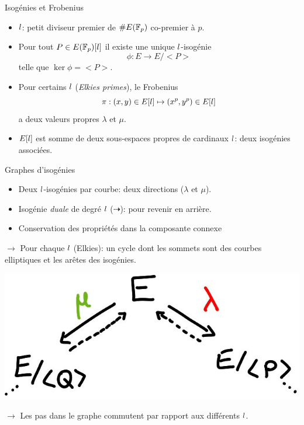 \documentclass{beamer}
\begin{document}
\begin{frame}{Isog\'enies et Frobenius}

	\begin{itemize}
		\item  $\mathnormal{l}$: petit diviseur premier de $\#E(\mathbb{F}_p)$ co-premier \`a $p$.
		\item Pour  tout $P\in E(\mathbb{F}_p)[\mathnormal{l}]$ il existe une unique $\mathnormal{\mathnormal{l}}$-isog\'enie
	\[
		\phi: E\rightarrow E/<P>
	\]
	telle que $\ker\phi = <P>$.
\item Pour certains $\mathnormal{\mathnormal{l}}$ (\textit{Elkies primes}), le Frobenius
		\[
			\pi: (x, y)\in E[\mathnormal{l}]\mapsto (x^p, y^p)\in E[\mathnormal{l}]
		\]
	a deux valeurs propres $\lambda$ et $\mu$.
\item $E[\mathnormal{l}]$ est somme de deux sous-espaces propres de cardinaux $\mathnormal{l}$: deux isog\'enies associ\'ees.
	\end{itemize}
\end{frame}

\begin{frame}{Graphes d'isog\'enies}
	\begin{itemize}
		\item Deux $\mathnormal{l}$-isog\'enies par courbe: deux directions ($\lambda$ et $\mu$).
		\item Isog\'enie \textit{duale} de degr\'e $\mathnormal{l}$ ($\dashrightarrow$): pour revenir en arri\`ere.
		\item Conservation des propri\'et\'es dans la composante connexe
	\end{itemize}
	 \vspace*{0.2cm}
	$\rightarrow$ Pour chaque $\mathnormal{l}$ (Elkies): un cycle dont les sommets sont des courbes elliptiques et les ar\^etes des isog\'enies.
	 \vspace*{0.2cm}
	\begin{center}
		\includegraphics[scale=0.2]{../figs/Cycle}
	\end{center}
	$\rightarrow$ Les pas dans le graphe commutent par rapport aux différents $\mathnormal{l}$.
\end{frame}
\end{document}
